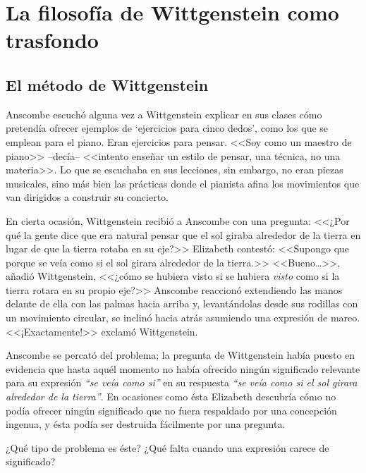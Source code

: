 \section{La filosofía de Wittgenstein como trasfondo}

\subsection{El método de Wittgenstein}

Anscombe escuchó alguna vez a Wittgenstein explicar en sus clases cómo pretendía
ofrecer ejemplos de `ejercicios para cinco dedos', como los que se emplean para
el piano. Eran ejercicios para pensar. <<Soy como un maestro de piano>>
--decía-- <<intento enseñar un estilo de pensar, una técnica, no una materia>>.
Lo que se escuchaba en sus lecciones, sin embargo, no eran piezas musicales,
sino más bien las prácticas donde el pianista afina los movimientos que van
dirigidos a construir su concierto.\autocite[cf.~][p.~357]{pubnpriv}

En cierta ocasión, Wittgenstein recibió a Anscombe con una pregunta: <<¿Por qué
la gente dice que era natural pensar que el sol giraba alrededor de la tierra en
lugar de que la tierra rotaba en su eje?>> Elizabeth contestó: <<Supongo que
porque se veía como si el sol girara alrededor de la tierra.>> <<Bueno\ldots>>,
añadió Wittgenstein, <<¿cómo se hubiera visto si se hubiera \emph{visto} como si
la tierra rotara en su propio eje?>> Anscombe reaccionó extendiendo las manos
delante de ella con las palmas hacia arriba y, levantándolas desde sus rodillas
con un movimiento circular, se inclinó hacia atrás asumiendo una expresión de
mareo. <<¡Exactamente!>> exclamó Wittgenstein.\autocite[cf.~][p.~151]{IWT}

Anscombe se percató del problema; la pregunta de Wittgenstein había puesto en
evidencia que hasta aquél momento no había ofrecido ningún significado relevante
para su expresión \emph{``se veía como si''} en su respuesta \emph{``se veía
  como si el sol girara alrededor de la tierra''}. En ocasiones como ésta
Elizabeth descubría cómo no podía ofrecer ningún significado que no fuera
respaldado por una concepción ingenua, y ésta podía ser destruida fácilmente por
una pregunta. 

¿Qué tipo de problema es éste? ¿Qué falta cuando una expresión carece de
significado?

